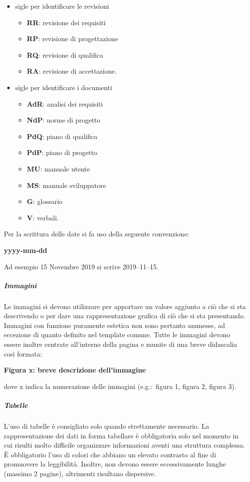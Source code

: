 \documentclass[../norme-di-progetto.tex]{subfiles}
\begin{document}
\begin{itemize}
  \item sigle per identificare le revisioni
        \begin{itemize}
          \item \textbf{RR}: revisione dei requisiti
          \item \textbf{RP}: revisione di progettazione
          \item \textbf{RQ}: revisione di qualifica
          \item \textbf{RA}: revisione di accettazione.
        \end{itemize}
  \item sigle per identificare i documenti
        \begin{itemize}
          \item \textbf{AdR}: analisi dei requisiti
          \item \textbf{NdP}: norme di progetto
          \item \textbf{PdQ}: piano di qualifica
          \item \textbf{PdP}: piano di progetto
          \item \textbf{MU}: manuale utente
          \item \textbf{MS}: manuale sviluppatore
          \item \textbf{G}: glossario
          \item \textbf{V}: verbali.
        \end{itemize}
\end{itemize}
Per la scrittura delle date si fa uso della seguente convenzione:
\begin{center}
  \textbf{yyyy-mm-dd}
\end{center}
Ad esempio 15 Novembre 2019 si scrive 2019--11--15.
\subparagraph{Immagini}%
\label{subp:immagini}
Le immagini si devono utilizzare per apportare un valore aggiunto a ciò che si sta descrivendo o per dare una rappresentazione grafica di ciò che si sta presentando.
Immagini con funzione puramente estetica non sono pertanto ammesse, ad eccezione di quanto definito nel template comune.
Tutte le immagini devono essere inoltre centrate all'interno della pagina e munite di una breve didascalia così formata:
\begin{center}
  \textbf{Figura x: breve descrizione dell'immagine}
\end{center}
dove x indica la numerazione delle immagini (e.g.:\ figura 1, figura 2, figura 3).

\subparagraph{Tabelle}%
\label{subp:tabelle}
L'uso di tabelle è consigliato solo quando strettamente necessario. La rappresentazione dei dati in forma tabellare è obbligatoria solo nel momento in cui risulti molto difficile organizzare informazioni aventi una struttura complessa. È obbligatorio l'uso di colori che abbiano un elevato contrasto al fine di promuovere la leggibilità. Inoltre, non devono essere eccessivamente lunghe (massimo 2 pagine), altrimenti risultano dispersive.
\end{document}
